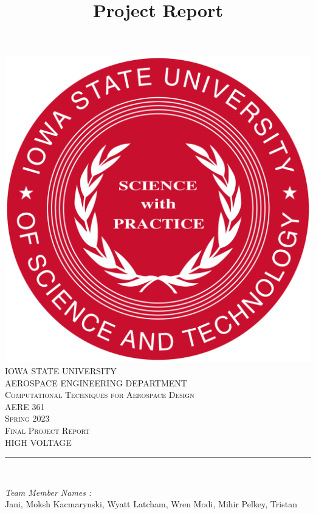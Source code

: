 \documentclass[12pt]{article}
\begin{document}
\title{Project Report}

\begin{titlepage}
	\centering
    \vspace*{0.5 cm}
    \includegraphics[scale = 0.11]{isu_seal.png}\\[1.0 cm]	%
    \textsc{\LARGE IOWA STATE UNIVERSITY}\\[2.0 cm]
    \textsc{\large AEROSPACE ENGINEERING DEPARTMENT}\\[0.2 cm]
    \textsc{\large Computational Techniques for Aerospace Design}\\[0.2 cm]
	\textsc{\Large AERE 361}\\[0.5 cm]				%
	\textsc{\Large Spring 2023}\\[0.5 cm]				%
	\textsc{\Large Final Project Report}\\[0.2 cm]
	\textsc{\Large HIGH VOLTAGE}\\[0.2 cm]
	\rule{\linewidth}{0.2 mm} \\[0.4 cm]
	
	
	\begin{minipage}{0.8\textwidth}
		
			\begin{flushleft} 
			\emph{Team Member Names :} \\
                Jani, Moksh\linebreak
			Kacmarynski, Wyatt\linebreak
			Latcham, Wren\linebreak
			Modi, Mihir\linebreak
			Pelkey, Tristan\linebreak
			

\end{flushleft}
\end{minipage}
\end{titlepage}
\end{document}

